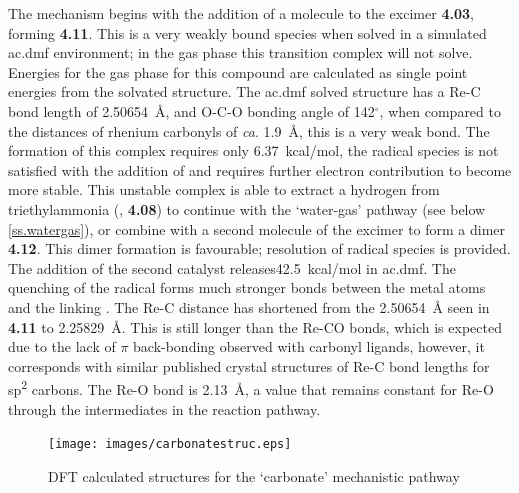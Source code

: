 The mechanism begins with the addition of a  molecule to the excimer \textbf{4.03}, forming \textbf{4.11}. This is a very weakly bound species when solved in a simulated \gls{ac.dmf} environment; in the gas phase this transition complex will not solve. Energies for the gas phase for this compound are calculated as single point energies from the solvated structure. The \gls{ac.dmf} solved structure has a Re-C bond length of 2.50654~\r{A}, and O-C-O bonding angle of 142$^\circ$, when compared to the  distances of rhenium carbonyls of \textit{ca}. 1.9~\r{A}, this is a very weak bond. The formation of this complex requires only 6.37~kcal/mol, the radical species is not satisfied with the addition of  and requires further electron contribution to become more stable. This unstable complex is able to extract a hydrogen from triethylammonia (, \textbf{4.08}) to continue with the `water-gas' pathway (see below \autoref{ss.watergas}), or combine with a second molecule of the excimer to form a dimer \textbf{4.12}. This dimer formation is favourable; resolution of radical species is provided. The addition of the second catalyst releases42.5~kcal/mol in \gls{ac.dmf}. The quenching of the radical forms much stronger bonds between the metal atoms and the linking . The Re-C distance has shortened from the 2.50654~\r{A} seen in \textbf{4.11} to 2.25829~\r{A}. This is still longer than the Re-CO bonds, which is expected due to the lack of $\pi$ back-bonding observed with carbonyl ligands, however, it corresponds with similar published crystal structures of Re-C bond lengths for sp\textsuperscript{2} carbons\autocite{lukehart1977}. The Re-O bond is 2.13~\r{A}, a value that remains constant for Re-O through the intermediates in the reaction pathway.

\begin{figure}[!ht]
 \begin{center}
  \texttt{[image: images/carbonatestruc.eps]}
 \end{center}
\caption{DFT calculated structures for the `carbonate' mechanistic pathway}
\label{fig.carbonatestruc}
\end{figure} 

